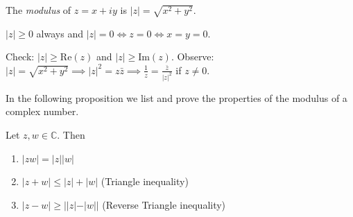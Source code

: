 \documentclass[12pt]{article}
\newcommand{\C}{\mathbb{C}}
\newcommand{\Rea}{\text{Re}}
\newcommand{\Ima}{\text{Im}}
\begin{document}
\begin{definition}
The \emph{modulus} of $z = x + iy$ is $|z| = \sqrt{x^2 + y^2}$.
\end{definition}
\begin{remark}
$|z| \ge 0$ always and $|z| = 0 \iff z = 0 \iff x = y = 0$.
\end{remark}

Check: $|z|\ge \Rea(z)$ and $|z| \ge \Ima(z)$.
Observe: $|z| = \sqrt{x^2+y^2} \implies |z|^2 = z\bar{z} \implies \frac{1}{z} = \frac{\bar{z}}{|z|^2}$ if $z\neq 0$.

In the following proposition we list and prove the properties of the modulus of a complex number.
\begin{proposition}
Let $z,w \in \C$. Then
\begin{enumerate}
    \item $|zw| = |z||w|$
    \item $|z+w| \le |z| + |w|$ (Triangle inequality)
    \item $|z-w| \ge ||z|-|w||$ (Reverse Triangle inequality)
\end{enumerate}
\end{proposition}
\end{document}
